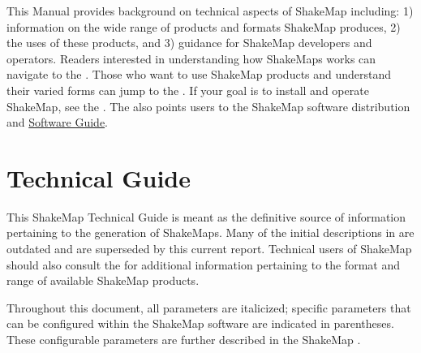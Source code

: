 \documentclass[letterpaper,10pt,english]{sphinxmanual}
\begin{document}
This Manual provides background on technical aspects of ShakeMap including: 1) information on
the wide range of products and formats ShakeMap produces, 2) the uses of these products,
and 3) guidance for
ShakeMap developers and operators. Readers interested in understanding how
ShakeMaps works can navigate to the {\hyperref[technical_guide:technical\string-guide]{}}. Those who want to use
ShakeMap products and understand their varied forms can jump to the {\hyperref[users_guide:users\string-guide]{}}.
If your goal is to install and operate ShakeMap, see the {\hyperref[software_guide:software\string-guide]{}}. The
{\hyperref[software_guide:software\string-guide]{}} also points users to the ShakeMap software distribution and
\href{http://usgs.github.io/shakemap/\_static/SoftwareGuideV3\_5.pdf}{Software Guide}.


\chapter{Technical Guide}
\label{technical_guide::doc}\label{technical_guide:id1}\label{technical_guide:technical-guide}
This ShakeMap Technical Guide is meant as the definitive source of information
pertaining to the generation of ShakeMaps.  Many of the initial descriptions in {\hyperref[references:wald1999a]{}} are outdated and are superseded by this current report.  Technical users of
ShakeMap should also consult the {\hyperref[users_guide:users\string-guide]{}} for additional information
pertaining to the format and range of available ShakeMap products.

Throughout this document, all parameters are italicized; specific parameters that can be configured within the
ShakeMap software are indicated in parentheses.  These configurable
parameters are further described in the ShakeMap {\hyperref[software_guide:sm35\string-software\string-guide]{}}.
\end{document}
